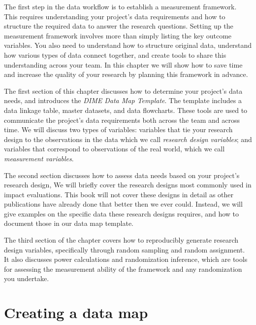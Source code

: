 
\begin{fullwidth}
The first step in the data workflow is to establish a measurement framework.
This requires understanding your project's data requirements
and how to structure the required data to answer the research questions.
Setting up the measurement framework involves more than
simply listing the key outcome variables.
You also need to understand how to structure original data,
understand how various types of data connect together,
and create tools to share this understanding across your team.
In this chapter we will show how to save time
and increase the quality of your research by
planning this framework in advance.

The first section of this chapter discusses how to
determine your project's data needs,
and introduces the \textit{DIME Data Map Template}.
The template includes a data linkage table,
master datasets, and data flowcharts.
These tools are used to communicate the project's data requirements
both across the team and across time.
We will discuss two types of variables:
variables that tie your research design
to the observations in the data
which we call \textit{research design variables};
and variables that correspond to observations of the real world,
which we call \textit{measurement variables}.

The second section discusses how to assess data needs
based on your project's research design,
We will briefly cover the research designs
most commonly used in impact evaluations.
This book will not cover these designs in detail
as other publications have already done that better then we ever could.
Instead, we will give examples on the specific data these research designs requires,
and how to document those in our data map template.

The third section of the chapter covers how to reproducibly generate research design variables,
specifically through random sampling and random assignment.
It also discusses power calculations and randomization inference,
which are tools for assessing the measurement ability of
the framework and any randomization you undertake.


\end{fullwidth}


\section{Creating a data map}

